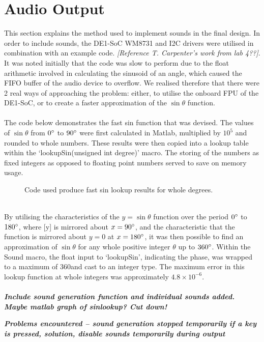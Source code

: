 \documentclass[a4paper,12pt]{article}
\begin{document}
\section{Audio Output}
\begin{flushleft}
This section explains the method used to implement sounds in the final design. In order to include sounds, the DE1-SoC WM8731 and I2C drivers were utilised in combination with an example code. \textit{[Reference T. Carpenter’s work from lab 4??]}. It was noted initially that the code was slow to perform due to the float arithmetic involved in calculating the sinusoid of an angle, which caused the FIFO buffer of the audio device to overflow. We realised therefore that there were 2 real ways of approaching the problem: either, to utilise the onboard FPU of the DE1-SoC, or to create a faster approximation of the $\sin\theta$ function.
\\ \- \\
The code below demonstrates the fast sin function that was devised. The values of $\sin\theta$ from $0\degree$ to $90\degree$ were first calculated in Matlab, multiplied by $10^5$ and rounded to whole numbers. These results were then copied into a lookup table within the ‘lookupSin(unsigned int degree)’ macro. The storing of the numbers as fixed integers as opposed to floating point numbers served to save on memory usage.

\begin{figure}[H]
	\centering
	
	\caption{Code used produce fast sin lookup results for whole degrees.}
\end{figure}

\- \\
By utilising the characteristics of the $y=\sin\theta$ function over the period $0\degree$ to $180\degree$, where [y] is mirrored about $x=90\degree$, and the characteristic that the function is mirrored about $y=0$ at $x=180\degree$, it was then possible to find an approximation of $\sin\theta$ for any whole positive integer $\theta$ up to $360\degree$. Within the Sound macro, the float input to ‘lookupSin’, indicating the phase, was wrapped to a maximum of 360\degree and cast to an integer type. The maximum error in this lookup function at whole integers was approximately $4.8\times10^{-6}$.
\\ \- \\

\textbf{\textit{Include sound generation function and individual sounds added. Maybe matlab graph of sinlookup? Cut down!}}

\textbf{\textit{Problems encountered – sound generation stopped temporarily if a key is pressed, solution, disable sounds temporarily during output}}
  

\end{flushleft}
\end{document}
